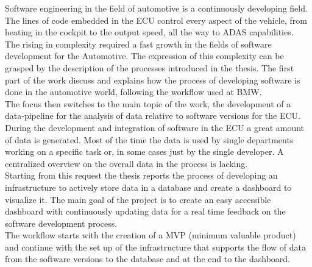 \documentclass[../main.tex]{subfiles}
\begin{document}
Software engineering in the field of automotive is a continuously developing field. The lines of code embedded in the ECU control every aspect of the vehicle, from heating in the cockpit to the output speed, all the way to ADAS capabilities.\\
The rising in complexity required a fast growth in the fields of software development for the Automotive. The expression of this complexity can be grasped by the description of the processes introduced in the thesis. The first part of the work discuss and explains how the process of developing software is done in the automotive world, following the workflow used at BMW.\\
The focus then switches to the main topic of the work, the development of a data-pipeline for the analysis of data relative to software versions for the ECU. During the development and integration of software in the ECU a great amount of data is generated. Most of the time the data is used by single departments working on a specific task or, in some cases just by the single developer. A centralized overview on the overall data in the process is lacking.\\
Starting from this request the thesis reports the process of developing an infrastructure to actively store data in a database and create a dashboard to visualize it. The main goal of the project is to create an easy accessible dashboard with continuously updating data for a real time feedback on the software development process.\\
The workflow starts with the creation of a MVP (minimum valuable product) and continue with the set up of the infrastructure that supports the flow of data from the software versions to the database and at the end to the dashboard.\\

\cleardoublepage
\end{document}
